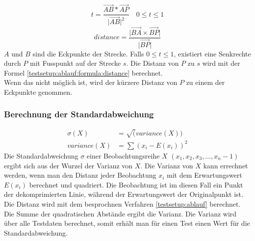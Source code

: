 \begin{equation} \label{testsetup:ablauf:formula:on_line}
 t = \frac{\vec{AB}*\vec{AP}}{\lvert \vec{AB}\rvert ^2} \quad 0 \leq t \leq 1
\end{equation}
\begin{equation}\label{testsetup:ablauf:formula:distance}
distance = \frac{\lvert \vec{BA}\times \vec{BP}\rvert}{\lvert \vec{BP} \rvert}
\end{equation}
$A$ und $B$ sind die Eckpunkte der Strecke. Falls $0 \leq t \leq 1$, existiert eine Senkrechte durch $P$ mit Fusspunkt auf der Strecke $s$. Die Distanz von $P$ zu $s$ wird mit der Formel \eqref{testsetup:ablauf:formula:distance} berechnet.\\
Wenn das nicht möglich ist, wird der kürzere Distanz von $P$ zu einem der Eckpunkte genommen. 

\subsubsection{Berechnung der Standardabweichung}
\begin{equation} \label{testsetup:ablauf:formula:deviation}
	\begin{split}
		\sigma(X)& = \sqrt(variance(X))\\
		variance(X) & = \sum{(x_i - E(x_i))^2}
	\end{split}
\end{equation}
Die Standardabweichung $\sigma$ einer Beobachtungsreihe $X$ $(x_1,x_2,x_3,\ldots, x_n-1)$ ergibt sich aus der Wurzel der Varianz von $X$. Die Varianz von $X$ kann errechnet werden, wenn man den Distanz jeder Beobachtung $x_i$ mit dem Erwartungswert $E(x_i)$ berechnet und quadriert. Die Beobachtung ist im diesen Fall ein Punkt der dekomprimierten Linie, während der Erwartungswert der Originalpunkt ist. Die Distanz wird mit dem besprochnen Verfahren \ref{testsetup:ablauf} berechnet. Die Summe der quadratischen Abstände ergibt die Varianz. Die Varianz wird über alle Testdaten berechnet, somit erhält man für einen Test einen Wert für die Standardabweichung.

